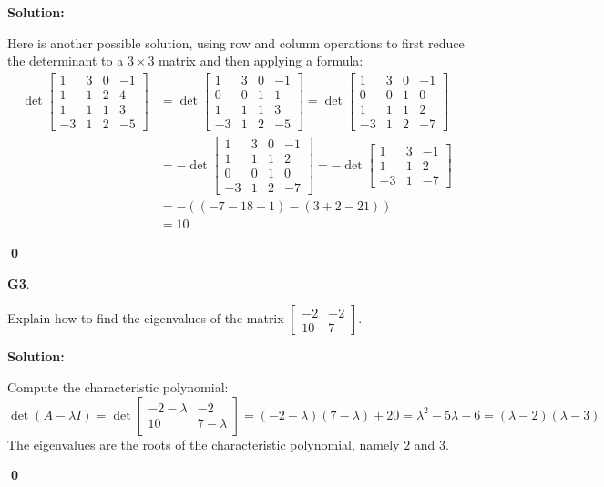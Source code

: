 \documentclass{article}
\newenvironment{problem}[1]
{
  \begin{flushleft}
  \textbf{#1}.
  \ignorespaces
}
{
  \end{flushleft}
}
\newenvironment{solution}
{
  \ignorespaces
  \textbf{Solution:}
}
{
  \ignorespacesafterend
  \begin{flushright}
  {\bfseries \qed}
  \end{flushright}
}
\begin{document}
\begin{solution}
Here is another possible solution, using row and column operations to first reduce
the determinant to a \(3\times 3\) matrix and then applying a formula:
\begin{align*}
\det
  \begin{bmatrix}
    1 & 3 & 0 & -1 \\
    1 & 1 & 2 & 4 \\
    1 & 1 & 1 & 3 \\
    -3 & 1 & 2 & -5
  \end{bmatrix}
&=
\det \begin{bmatrix} 1 & 3 & 0 & -1 \\ 0 & 0 & 1 & 1 \\ 1 & 1 & 1 & 3 \\ -3 & 1 & 2 & -5 \end{bmatrix} =
\det \begin{bmatrix} 1 & 3 & 0 & -1 \\ 0 & 0 & 1 & 0 \\ 1 & 1 & 1 & 2 \\ -3 & 1 & 2 & -7 \end{bmatrix} \\ &=
-\det \begin{bmatrix} 1 & 3 & 0 & -1 \\ 1 & 1 & 1 & 2 \\ 0 & 0 & 1 & 0 \\ -3 & 1 & 2 & -7 \end{bmatrix} =
-\det \begin{bmatrix} 1 & 3 & -1 \\ 1 & 1 & 2 \\ -3 & 1  & -7 \end{bmatrix} \\  &=
-((-7-18-1)-(3+2-21)) \\
 &=10
 \end{align*}



\end{solution}

\begin{problem}{G3}
Explain how to find the eigenvalues of the matrix \(\begin{bmatrix} -2 & -2 \\ 10 & 7 \end{bmatrix} \).
\end{problem}
\begin{solution}
Compute the characteristic polynomial: 
\[\det(A-\lambda I) = \det \begin{bmatrix} -2 - \lambda & -2 \\ 10 & 7-\lambda \end{bmatrix} = (-2-\lambda)(7-\lambda)+20 = \lambda ^2 -5\lambda +6 = (\lambda -2)(\lambda -3)\]
The eigenvalues are the roots of the characteristic polynomial, namely $2$ and $3$.
\end{solution}
\end{document}
